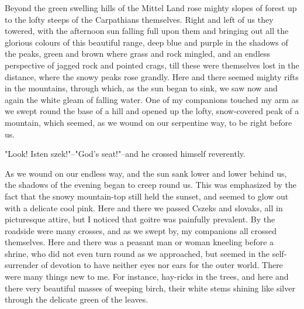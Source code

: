 Beyond the green swelling hills of the Mittel Land rose mighty slopes of forest up to the lofty steeps of the Carpathians themselves. Right and left of us they towered, with the afternoon sun falling full upon them and bringing out all the glorious colours of this beautiful range, deep blue and purple in the shadows of the peaks, green and brown where grass and rock mingled, and an endless perspective of jagged rock and pointed crags, till these were themselves lost in the distance, where the snowy peaks rose grandly. Here and there seemed mighty rifts in the mountains, through which, as the sun began to sink, we saw now and again the white gleam of falling water. One of my companions touched my arm as we swept round the base of a hill and opened up the lofty, snow-covered peak of a mountain, which seemed, as we wound on our serpentine way, to be right before us. 

"Look! Isten szek!"--"God's seat!"--and he crossed himself reverently. 

As we wound on our endless way, and the sun sank lower and lower behind us, the shadows of the evening began to creep round us. This was emphasized by the fact that the snowy mountain-top still held the sunset, and seemed to glow out with a delicate cool pink. Here and there we passed Cszeks and slovaks, all in picturesque attire, but I noticed that goitre was painfully prevalent. By the roadside were many crosses, and as we swept by, my companions all crossed themselves. Here and there was a peasant man or woman kneeling before a shrine, who did not even turn round as we approached, but seemed in the self-surrender of devotion to have neither eyes nor ears for the outer world. There were many things new to me. For instance, hay-ricks in the trees, and here and there very beautiful masses of weeping birch, their white stems shining like silver through the delicate green of the leaves. 

